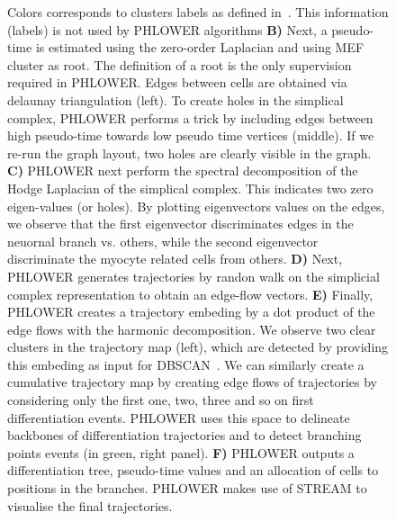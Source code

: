 \begin{figure}[!ht]
{  Colors corresponds to clusters labels as defined in~\citep{treutlein2016dissecting}. This information (labels) is not used by PHLOWER algorithms \textbf{B)} Next, a pseudo-time is estimated using the zero-order Laplacian and using MEF cluster as root. The definition of a root is the only supervision required in PHLOWER. Edges between cells are obtained via delaunay triangulation (left).  To create holes in the simplical complex, PHLOWER performs a trick by including edges between high pseudo-time towards low pseudo time vertices (middle). If we re-run the graph layout, two holes are clearly visible in the graph. \textbf{C)} PHLOWER next perform the spectral decomposition of the Hodge Laplacian of the simplical complex. This indicates two zero eigen-values (or holes). By plotting eigenvectors values on the edges, we observe that the first eigenvector discriminates edges in the neuornal branch vs. others, while the second eigenvector discriminate the myocyte related cells from others. \textbf{D)} Next, PHLOWER generates trajectories by randon walk on the simplicial complex representation to obtain an edge-flow vectors. \textbf{E)} Finally, PHLOWER creates a trajectory embeding by a dot product of the edge flows with the harmonic decomposition. We observe two clear clusters in the trajectory map (left), which are detected by providing this embeding as input for DBSCAN~\citep{ester1996dbscan}.  We can similarly create a cumulative trajectory map by creating edge flows of trajectories by considering only the first one, two, three and so on first differentiation events. PHLOWER uses this space to delineate backbones of differentiation trajectories and to detect branching points events (in green, right panel). \textbf{F)} PHLOWER outputs a differentiation tree, pseudo-time values and an allocation of cells to positions in the branches. PHLOWER makes use of STREAM to visualise the final trajectories.}
  \label{supfig:fib2neuron-workflow}
\end{figure}



